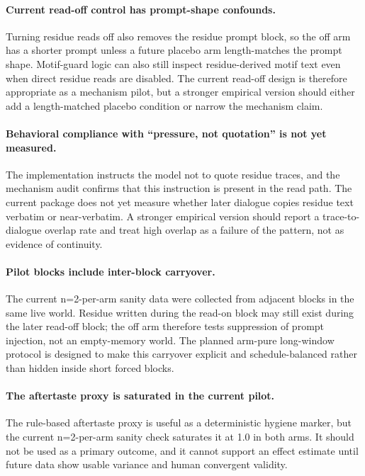 \documentclass[11pt]{article}
\begin{document}
\paragraph{Current read-off control has prompt-shape confounds.}
Turning residue reads off also removes the residue prompt block, so the off arm
has a shorter prompt unless a future placebo arm length-matches the prompt
shape. Motif-guard logic can also still inspect residue-derived motif text even
when direct residue reads are disabled. The current read-off design is therefore
appropriate as a mechanism pilot, but a stronger empirical version should either
add a length-matched placebo condition or narrow the mechanism claim.

\paragraph{Behavioral compliance with ``pressure, not quotation'' is not yet measured.}
The implementation instructs the model not to quote residue traces, and the
mechanism audit confirms that this instruction is present in the read path. The
current package does not yet measure whether later dialogue copies residue text
verbatim or near-verbatim. A stronger empirical version should report a
trace-to-dialogue overlap rate and treat high overlap as a failure of the
pattern, not as evidence of continuity.

\paragraph{Pilot blocks include inter-block carryover.}
The current n=2-per-arm sanity data were collected from adjacent blocks in the
same live world. Residue written during the read-on block may still exist during
the later read-off block; the off arm therefore tests suppression of prompt
injection, not an empty-memory world. The planned arm-pure long-window protocol
is designed to make this carryover explicit and schedule-balanced rather than
hidden inside short forced blocks.

\paragraph{The aftertaste proxy is saturated in the current pilot.}
The rule-based aftertaste proxy is useful as a deterministic hygiene marker, but
the current n=2-per-arm sanity check saturates it at 1.0 in both arms. It should
not be used as a primary outcome, and it cannot support an effect estimate until
future data show usable variance and human convergent validity.
\end{document}
